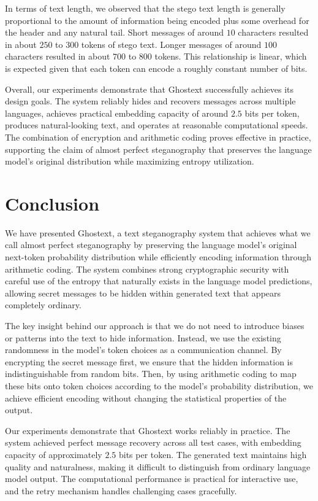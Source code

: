 \documentclass[sigconf,review,anonymous]{acmart}
\begin{document}
In terms of text length, we observed that the stego text length is generally proportional to the amount of information being encoded plus some overhead for the header and any natural tail. Short messages of around $10$ characters resulted in about $250$ to $300$ tokens of stego text. Longer messages of around $100$ characters resulted in about $700$ to $800$ tokens. This relationship is linear, which is expected given that each token can encode a roughly constant number of bits.

Overall, our experiments demonstrate that Ghostext successfully achieves its design goals. The system reliably hides and recovers messages across multiple languages, achieves practical embedding capacity of around $2.5$ bits per token, produces natural-looking text, and operates at reasonable computational speeds. The combination of encryption and arithmetic coding proves effective in practice, supporting the claim of almost perfect steganography that preserves the language model's original distribution while maximizing entropy utilization.

\section{Conclusion}

We have presented Ghostext, a text steganography system that achieves what we call almost perfect steganography by preserving the language model's original next-token probability distribution while efficiently encoding information through arithmetic coding. The system combines strong cryptographic security with careful use of the entropy that naturally exists in the language model predictions, allowing secret messages to be hidden within generated text that appears completely ordinary.

The key insight behind our approach is that we do not need to introduce biases or patterns into the text to hide information. Instead, we use the existing randomness in the model's token choices as a communication channel. By encrypting the secret message first, we ensure that the hidden information is indistinguishable from random bits. Then, by using arithmetic coding to map these bits onto token choices according to the model's probability distribution, we achieve efficient encoding without changing the statistical properties of the output.

Our experiments demonstrate that Ghostext works reliably in practice. The system achieved perfect message recovery across all test cases, with embedding capacity of approximately $2.5$ bits per token. The generated text maintains high quality and naturalness, making it difficult to distinguish from ordinary language model output. The computational performance is practical for interactive use, and the retry mechanism handles challenging cases gracefully.
\end{document}
